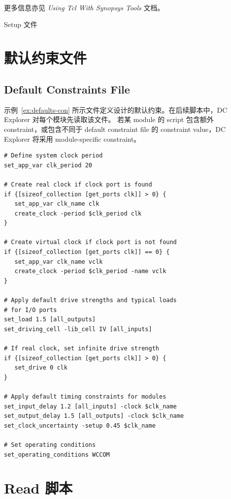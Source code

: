 更多信息亦见 \textit{Using Tcl With Synopsys Tools} 文档。

\begin{seeAlsoBox}
Setup 文件
\end{seeAlsoBox}

\section{默认约束文件}
\subsection*{Default Constraints File}

示例~\ref{ex:defaults-con} 所示文件定义设计的默认约束。在后续脚本中，DC Explorer 对每个模块先读取该文件。
若某 module 的 script 包含额外 constraint，或包含不同于 default constraint file 的 constraint value，DC Explorer 将采用 module-specific constraint。

\begin{lstlisting}[caption={defaults.con},label=ex:defaults-con]
# Define system clock period
set_app_var clk_period 20

# Create real clock if clock port is found
if {[sizeof_collection [get_ports clk]] > 0} {
   set_app_var clk_name clk
   create_clock -period $clk_period clk
}

# Create virtual clock if clock port is not found
if {[sizeof_collection [get_ports clk]] == 0} {
   set_app_var clk_name vclk
   create_clock -period $clk_period -name vclk
}

# Apply default drive strengths and typical loads
# for I/O ports
set_load 1.5 [all_outputs]
set_driving_cell -lib_cell IV [all_inputs]

# If real clock, set infinite drive strength
if {[sizeof_collection [get_ports clk]] > 0} {
   set_drive 0 clk
}

# Apply default timing constraints for modules
set_input_delay 1.2 [all_inputs] -clock $clk_name
set_output_delay 1.5 [all_outputs] -clock $clk_name
set_clock_uncertainty -setup 0.45 $clk_name

# Set operating conditions
set_operating_conditions WCCOM
\end{lstlisting}

\section{Read 脚本}
